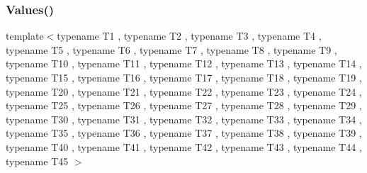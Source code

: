 \mbox{\label{namespacetesting_a227b4b3b251f5f4aa0e1261c27fe9dd4}} 
\subsubsection{\texorpdfstring{Values()}{Values()}\hspace{0.1cm}{\footnotesize\ttfamily [46/51]}}
{\footnotesize\ttfamily template$<$typename T1 , typename T2 , typename T3 , typename T4 , typename T5 , typename T6 , typename T7 , typename T8 , typename T9 , typename T10 , typename T11 , typename T12 , typename T13 , typename T14 , typename T15 , typename T16 , typename T17 , typename T18 , typename T19 , typename T20 , typename T21 , typename T22 , typename T23 , typename T24 , typename T25 , typename T26 , typename T27 , typename T28 , typename T29 , typename T30 , typename T31 , typename T32 , typename T33 , typename T34 , typename T35 , typename T36 , typename T37 , typename T38 , typename T39 , typename T40 , typename T41 , typename T42 , typename T43 , typename T44 , typename T45 $>$ \\
}

